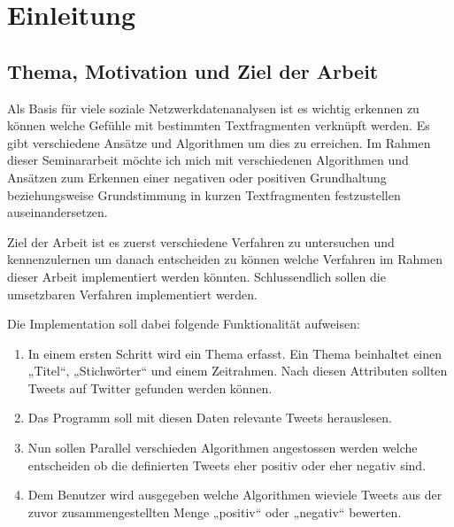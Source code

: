 \section{Einleitung}
\subsection{Thema, Motivation und Ziel der Arbeit}
Als Basis für viele soziale Netzwerkdatenanalysen ist es wichtig erkennen zu können welche Gefühle mit bestimmten Textfragmenten verknüpft werden.
Es gibt verschiedene Ansätze und Algorithmen um dies zu erreichen. Im Rahmen dieser Seminararbeit möchte ich mich mit verschiedenen Algorithmen 
und Ansätzen zum Erkennen einer negativen oder positiven Grundhaltung beziehungsweise Grundstimmung in kurzen Textfragmenten festzustellen 
auseinandersetzen.

Ziel der Arbeit ist es zuerst verschiedene Verfahren zu untersuchen und kennenzulernen um danach entscheiden zu können welche Verfahren im 
Rahmen dieser Arbeit implementiert werden könnten. Schlussendlich sollen die umsetzbaren Verfahren implementiert werden.

Die Implementation soll dabei folgende Funktionalität aufweisen:
\begin{enumerate}
\item In einem ersten Schritt wird ein Thema erfasst. Ein Thema beinhaltet einen „Titel“, „Stichwörter“ und einem Zeitrahmen. Nach diesen Attributen sollten Tweets auf Twitter gefunden werden können.
\item Das Programm soll mit diesen Daten relevante Tweets herauslesen.
\item Nun sollen Parallel verschieden Algorithmen angestossen werden welche entscheiden ob die definierten Tweets eher positiv oder eher negativ sind.
\item Dem Benutzer wird ausgegeben welche Algorithmen wieviele Tweets aus der zuvor zusammengestellten Menge „positiv“ oder „negativ“ bewerten.
\end{enumerate}

